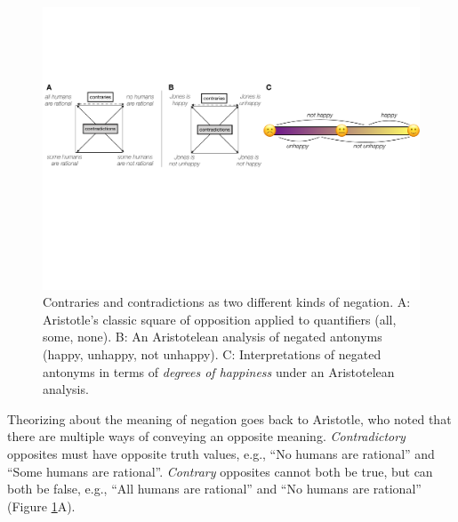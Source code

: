 \documentclass[floatsintext,doc]{apa6}
\begin{document}
\begin{figure}[t]
\center \includegraphics[width=1\textwidth]{figs/opp-square2}  
\caption{Contraries and contradictions as two different kinds of negation. A: Aristotle's classic square of opposition applied to quantifiers (all, some, none). B: An Aristotelean analysis of negated antonyms (happy, unhappy, not unhappy). C: Interpretations of negated antonyms in terms of \emph{degrees of happiness} under an Aristotelean analysis.}\label{fig:opp-square}
\end{figure}


Theorizing about the meaning of negation goes back to Aristotle, who noted that there are multiple ways of conveying an opposite meaning.
\emph{Contradictory} opposites must have opposite truth values, e.g., \enquote{No humans are rational} and \enquote{Some humans are rational}. 
\emph{Contrary} opposites cannot both be true, but can both be false, e.g., \enquote{All humans are rational} and \enquote{No humans are rational}  (Figure \ref{fig:opp-square}A). 
\end{document}
